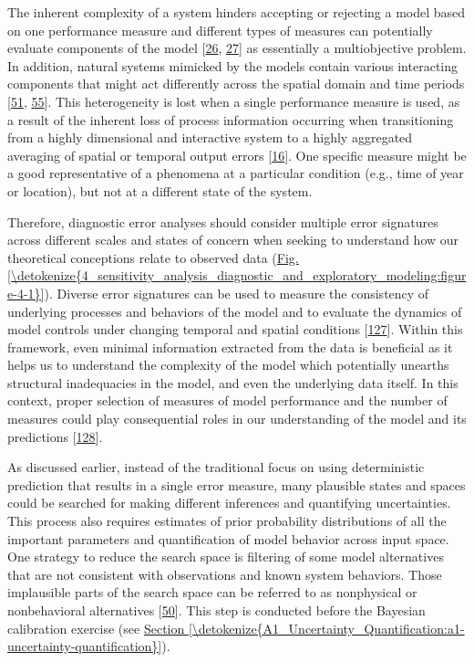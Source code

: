 \documentclass[letterpaper,10pt,english]{sphinxmanual}
\begin{document}
\sphinxAtStartPar
The inherent complexity of a system hinders accepting or rejecting a model based on one performance measure and different types of measures can potentially evaluate components of the model {[}\hyperlink{cite.index:id52}{26}, \hyperlink{cite.index:id51}{27}{]} as essentially a multiobjective problem. In addition, natural systems mimicked by the models contain various interacting components that might act differently across the spatial domain and time periods {[}\hyperlink{cite.index:id30}{51}, \hyperlink{cite.index:id53}{55}{]}. This heterogeneity is lost when a single performance measure is used, as a result of the inherent loss of process information occurring when transitioning from a highly dimensional and interactive system to a highly aggregated averaging of spatial or temporal output errors {[}\hyperlink{cite.index:id54}{16}{]}. One specific measure might be a good representative of a phenomena at a particular condition (e.g., time of year or location), but not at a different state of the system.

\sphinxAtStartPar
Therefore, diagnostic error analyses should consider multiple error signatures across different scales and states of concern when seeking to understand how our theoretical conceptions relate to observed data (\hyperref[\detokenize{4_sensitivity_analysis_diagnostic_and_exploratory_modeling:figure-4-1}]{Fig.\@ \ref{\detokenize{4_sensitivity_analysis_diagnostic_and_exploratory_modeling:figure-4-1}}}). Diverse error signatures can be used to measure the consistency of underlying processes and behaviors of the model and to evaluate the dynamics of model controls under changing temporal and spatial conditions {[}\hyperlink{cite.index:id56}{127}{]}. Within this framework, even minimal information extracted from the data is beneficial as it helps us to understand the complexity of the model which potentially unearths structural inadequacies in the model, and even the underlying data itself. In this context, proper selection of measures of model performance and the number of measures could play consequential roles in our understanding of the model and its predictions {[}\hyperlink{cite.index:id55}{128}{]}.

\sphinxAtStartPar
As discussed earlier, instead of the traditional focus on using deterministic prediction that results in a single error measure, many plausible states and spaces could be searched for making different inferences and quantifying uncertainties. This process also requires estimates of prior probability distributions of all the important parameters and quantification of model behavior across input space. One strategy to reduce the search space is filtering of some model alternatives that are not consistent with observations and known system behaviors. Those implausible parts of the search space can be referred to as non\sphinxhyphen{}physical or non\sphinxhyphen{}behavioral alternatives {[}\hyperlink{cite.index:id29}{50}{]}. This step is conducted before the Bayesian calibration exercise (see \hyperref[\detokenize{A1_Uncertainty_Quantification:a1-uncertainty-quantification}]{Section \ref{\detokenize{A1_Uncertainty_Quantification:a1-uncertainty-quantification}}}).
\end{document}
